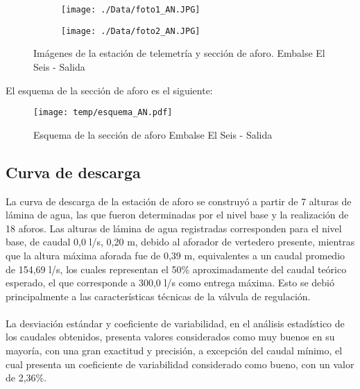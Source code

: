 \documentclass[]{article}
\begin{document}
\begin{figure}[H]
  \centering
\begin{subfigure}{.49\textwidth}
  \texttt{[image: ./Data/foto1\_AN.JPG]}
\end{subfigure}
\hfill
\begin{subfigure}{.49\textwidth}
  \texttt{[image: ./Data/foto2\_AN.JPG]}
\end{subfigure}
\caption{Imágenes de la estación de telemetría y sección de aforo. Embalse El Seis - Salida}
\label{fig:fotos_14}
\end{figure}

El esquema de la sección de aforo es el siguiente:

\begin{figure}[H]
  \centering
  \texttt{[image: temp/esquema\_AN.pdf]}
\caption{Esquema de la sección de aforo Embalse El Seis - Salida}
\label{fig:Esquema_AN}
\end{figure}

\subsection{Curva de descarga}\label{curva-de-descarga-13}

La curva de descarga de la estación de aforo se construyó a partir de 7 alturas de lámina de agua, las que fueron determinadas por el nivel base y la realización de 18 aforos. Las alturas de lámina de agua registradas corresponden para el nivel base, de caudal 0,0 l/s, 0,20 m, debido al aforador de vertedero presente, mientras que la altura máxima aforada fue de 0,39 m, equivalentes a un caudal promedio de 154,69 l/s, los cuales representan el 50\% aproximadamente del caudal teórico esperado, el que corresponde a 300,0 l/s como entrega máxima. Esto se debió principalmente a las características técnicas de la válvula de regulación.\\
\\
La desviación estándar y coeficiente de variabilidad, en el análisis estadístico de los caudales obtenidos, presenta valores considerados como muy buenos en su mayoría, con una gran exactitud y precisión, a excepción del caudal mínimo, el cual presenta un coeficiente de variabilidad considerado como bueno, con un valor de 2,36\%.
\end{document}
